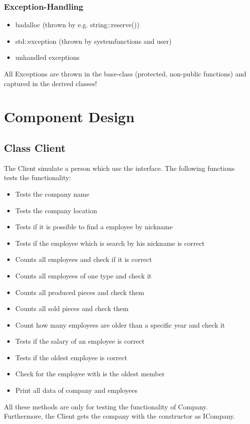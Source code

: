 \subsubsection{Exception-Handling}
\begin{itemize}
	\item badalloc (thrown by e.g. string::reserve())
	\item std::exception (thrown by systemfunctions and user)
	\item unhandled exceptions
\end{itemize}

All Exceptions are thrown in the base-class (protected, non-public functions) and captured in the derived classes!
	
\section{Component Design}
\subsection{Class Client}
The Client simulate a person which use the interface.
The following functions tests the functionality:
\begin{itemize}
	\item Tests the company name
	\item Tests the company location
	\item Tests if it is possible to find a employee by nickname
	\item Tests if the employee which is search by his nickname is correct
	\item Counts all employees and check if it is correct
	\item Counts all employees of one type and check it
	\item Counts all produced pieces and check them
	\item Counts all sold pieces and check them
	\item Count how many employees are older than a specific year and check it
	\item Tests if the salary of an employee is correct
	\item Tests if the oldest employee is correct
	\item Check for the employee with is the oldest member
	\item Print all data of company and employees
\end{itemize}

All these methods are only for testing the functionality of Company. Furthermore, the Client gets the company with the constructor as ICompany.

